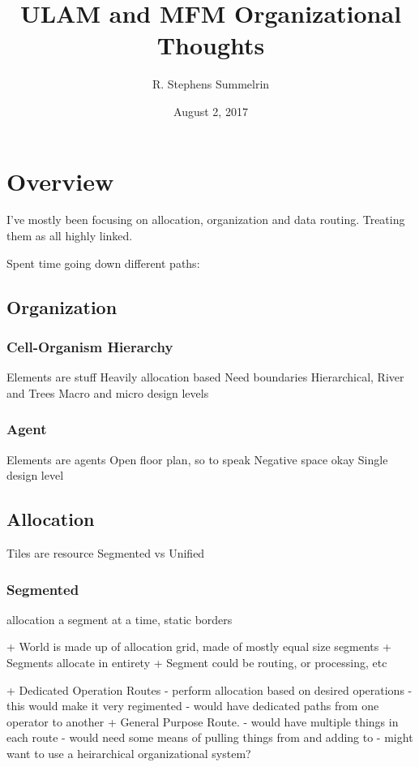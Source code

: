 \documentclass[article]{memoir}
\title{ULAM and MFM Organizational Thoughts}
\date{August 2, 2017}
\author{R. Stephens Summelrin}
\begin{document}
\maketitle
\tableofcontents


\chapter{Overview}

I've mostly been focusing on allocation, organization and data routing. 
Treating them as all highly linked. 

Spent time going down different paths:


\section{Organization}


\subsection{Cell-Organism Hierarchy}

Elements are stuff
Heavily allocation based
Need boundaries
Hierarchical, River and Trees
Macro and micro design levels


\subsection{Agent}

Elements are agents
Open floor plan, so to speak
Negative space okay
Single design level


\section{Allocation}

Tiles are resource
Segmented vs Unified

\subsection{Segmented}

allocation a segment at a time, static borders

+ World is made up of allocation grid, made of mostly equal size segments
+ Segments allocate in entirety 
+ Segment could be routing, or processing, etc


+ Dedicated Operation Routes
- perform allocation based on desired operations
- this would make it very regimented
- would have dedicated paths from one operator to another
+ General Purpose Route.
- would have multiple things in each route
- would need some means of pulling things from and adding to
- might want to use a heirarchical organizational system?
\end{document}
